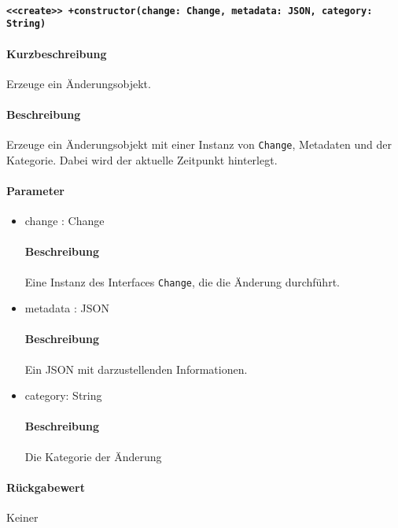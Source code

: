 \paragraph{\texttt{<<create>> +constructor(change: Change, metadata: JSON, category: String)}}%
\paragraph*{Kurzbeschreibung}
Erzeuge ein Änderungsobjekt.
\paragraph*{Beschreibung}
Erzeuge ein Änderungsobjekt mit einer Instanz von \verb#Change#, Metadaten und der Kategorie.
Dabei wird der aktuelle Zeitpunkt hinterlegt.
\paragraph*{Parameter}
\begin{itemize}
    \item change : Change
            \paragraph*{Beschreibung}
            Eine Instanz des Interfaces \verb#Change#, die die Änderung durchführt.
    \item metadata : JSON
            \paragraph*{Beschreibung}
            Ein JSON mit darzustellenden Informationen.
    \item category: String
            \paragraph*{Beschreibung}
            Die Kategorie der Änderung
\end{itemize}
\paragraph*{Rückgabewert}
Keiner